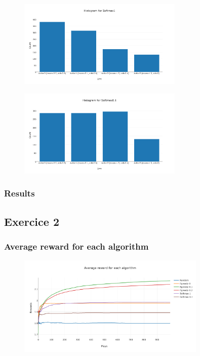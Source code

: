 \documentclass[11pt]{article}
\begin{document}
\begin{figure}[H]
   \centering
   \includegraphics[width=0.7\textwidth]{img/1-1/h5.png}
\end{figure}

\begin{figure}[H]
   \centering
   \includegraphics[width=0.7\textwidth]{img/1-1/h6.png}
\end{figure}


\subsubsection{Results}



\subsection{Exercice 2}

\subsubsection{Average reward for each algorithm}

\begin{figure}[H]
   \centering
   \includegraphics[width=0.8\textwidth]{img/1-2/reward.png}
\end{figure}
\end{document}

